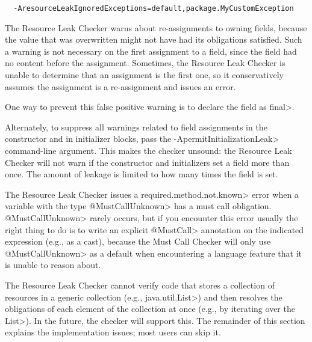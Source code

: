 \begin{verbatim}
  -AresourceLeakIgnoredExceptions=default,package.MyCustomException
\end{verbatim}



The Resource Leak Checker warns about re-assignments to owning fields,
because the value that was overwritten might not have had its obligations
satisfied.  Such a warning is not necessary on the first assignment to a
field, since the field had no content before the assignment.  Sometimes,
the Resource Leak Checker is unable to determine that an assignment is the
first one, so it conservatively assumes the assignment is a re-assignment
and issues an error.

One way to prevent this false positive warning is to declare the field as \<final>.

Alternately, to suppress all warnings related to field assignments in the
constructor and in initializer blocks, pass the
\<-ApermitInitializationLeak> command-line argument.  This makes the
checker unsound:  the Resource Leak Checker will not warn if the constructor
and initializers set a field more than once.  The amount of leakage is
limited to how many times the field is set.


The Resource Leak Checker issues a \<required.method.not.known> error
when a variable with the type \<@MustCallUnknown> has a must call obligation.
\<@MustCallUnknown> rarely occurs, but if you encounter this error usually
the right thing to do is to write an explicit \<@MustCall> annotation
on the indicated expression (e.g., as a cast), because the Must Call Checker
will only use \<@MustCallUnknown> as a default when encountering a language
feature that it is unable to reason about.


The Resource Leak Checker cannot verify code that stores a collection of
resources in a generic collection (e.g., \<java.util.List>) and then
resolves the obligations of each element of the collection at once (e.g.,
by iterating over the \<List>).  In the future, the checker will support
this.  The remainder of this section explains the implementation issues;
most users can skip it.

